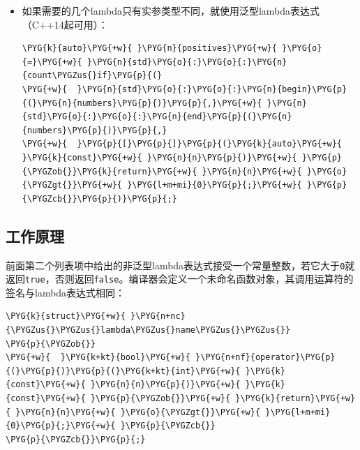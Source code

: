 \begin{itemize}

\item 如果需要的几个lambda只有实参类型不同，就使用泛型lambda表达式（C++14起可用）：



\begin{codeblockbg}
\begin{Verbatim}[commandchars=\\\{\},breaklines=true,breakanywhere=true,fontsize=\codefont,xleftmargin=17bp]
\PYG{k}{auto}\PYG{+w}{ }\PYG{n}{positives}\PYG{+w}{ }\PYG{o}{=}\PYG{+w}{ }\PYG{n}{std}\PYG{o}{:}\PYG{o}{:}\PYG{n}{count\PYGZus{}if}\PYG{p}{(}
\PYG{+w}{  }\PYG{n}{std}\PYG{o}{:}\PYG{o}{:}\PYG{n}{begin}\PYG{p}{(}\PYG{n}{numbers}\PYG{p}{)}\PYG{p}{,}\PYG{+w}{ }\PYG{n}{std}\PYG{o}{:}\PYG{o}{:}\PYG{n}{end}\PYG{p}{(}\PYG{n}{numbers}\PYG{p}{)}\PYG{p}{,}
\PYG{+w}{  }\PYG{p}{[}\PYG{p}{]}\PYG{p}{(}\PYG{k}{auto}\PYG{+w}{ }\PYG{k}{const}\PYG{+w}{ }\PYG{n}{n}\PYG{p}{)}\PYG{+w}{ }\PYG{p}{\PYGZob{}}\PYG{k}{return}\PYG{+w}{ }\PYG{n}{n}\PYG{+w}{ }\PYG{o}{\PYGZgt{}}\PYG{+w}{ }\PYG{l+m+mi}{0}\PYG{p}{;}\PYG{+w}{ }\PYG{p}{\PYGZcb{}}\PYG{p}{)}\PYG{p}{;}
\end{Verbatim}
\end{codeblockbg}

\end{itemize}



\subsection{工作原理}



前面第二个列表项中给出的非泛型lambda表达式接受一个常量整数，若它大于\texttt{0}就返回\texttt{true}，否则返回\texttt{false}。编译器会定义一个未命名函数对象，其调用运算符的签名与lambda表达式相同：



\begin{codeblockbg}
\begin{Verbatim}[commandchars=\\\{\},breaklines=true,breakanywhere=true,fontsize=\codefont,xleftmargin=17bp]
\PYG{k}{struct}\PYG{+w}{ }\PYG{n+nc}{\PYGZus{}\PYGZus{}lambda\PYGZus{}name\PYGZus{}\PYGZus{}}
\PYG{p}{\PYGZob{}}
\PYG{+w}{  }\PYG{k+kt}{bool}\PYG{+w}{ }\PYG{n+nf}{operator}\PYG{p}{(}\PYG{p}{)}\PYG{p}{(}\PYG{k+kt}{int}\PYG{+w}{ }\PYG{k}{const}\PYG{+w}{ }\PYG{n}{n}\PYG{p}{)}\PYG{+w}{ }\PYG{k}{const}\PYG{+w}{ }\PYG{p}{\PYGZob{}}\PYG{+w}{ }\PYG{k}{return}\PYG{+w}{ }\PYG{n}{n}\PYG{+w}{ }\PYG{o}{\PYGZgt{}}\PYG{+w}{ }\PYG{l+m+mi}{0}\PYG{p}{;}\PYG{+w}{ }\PYG{p}{\PYGZcb{}}
\PYG{p}{\PYGZcb{}}\PYG{p}{;}
\end{Verbatim}
\end{codeblockbg}


